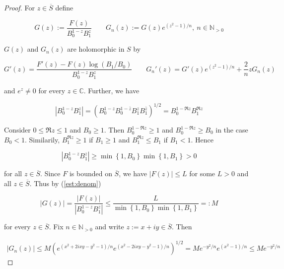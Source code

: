 \begin{proof}
For $z \in \overline{S}$ define 

\begin{equation*}
	G(z) := \frac{F(z)}{B_0^{1 - z}B_1^z} \qquad G_n(z) := G(z) e^{\left(z^2 - 1\right)/n},~n \in\mathbb{N}_{>0}
\end{equation*}

$G(z)$ and $G_n(z)$ are holomorphic in $S$ by
	
\begin{equation*}
	G'(z) = \frac{F'(z) - F(z)\log\left( B_1/B_0 \right)}{B_0^{1 - z}B_1^z} \qquad G_n'(z) = G'(z)e^{\left( z^2 - 1 \right)/n} + \frac{2}{n}zG_n(z)	
\end{equation*}

and $e^z \neq 0$ for every $z \in \mathbb{C}$. Further, we have

\begin{equation*}
		\left| B_0^{1 - z}B_1^z \right| = \left(B_0^{1 - z}B_0^{1 - \overline{z}} B_1^z B_1^{\overline{z}}\right)^{1/2} =  B_0^{1 -\Re z}B_1^{\Re z}
\end{equation*}

Consider $0 \leqslant \Re z \leqslant 1$ and $B_0 \geqslant 1$. Then $B_0^{1 - \Re z} \geqslant 1$ and $B_0^{1 - \Re z } \geqslant B_0$ in the case $B_0 < 1$. Similarily, $B_1^{\Re z} \geqslant 1$ if $B_1 \geqslant 1$ and $B_1^{\Re z} \leqslant B_1$ if $B_1 < 1$. Hence 

\begin{equation}
	\left| B_0^{1 - z}B_1^z \right| \geqslant \min\left\{1,B_0\right\}\min\left\{1,B_1\right\} > 0
	\label{est:denom}
\end{equation}

for all $z \in \overline{S}$. Since $F$ is bounded on $\overline{S}$, we have $\left| F(z) \right| \leqslant L$ for some $L > 0$ and all $z \in \overline{S}$. Thus by (\ref{est:denom})

\begin{equation*}
	\left| G(z)\right| = \frac{\left| F(z)\right|}{\left| B_0^{1 - z}B_1^z \right|} \leqslant \frac{L}{\min\left\{1,B_0\right\}\min\left\{1,B_1\right\}} =: M
\end{equation*}

for every $z \in \overline{S}$. Fix $n \in \mathbb{N}_{>0}$ and write $z := x + iy \in \overline{S}$. Then

\begin{gather*}
	\left| G_n(z)\right| \leqslant M \left(e^{\left(x^2 + 2ixy -y^2 - 1\right)/n} e^{\left(x^2 - 2ixy -y^2 - 1\right)/n}\right)^{1/2}= M e^{-y^2/n}e^{\left(x^2 - 1\right)/n} \leqslant Me^{-y^2/n}
\end{gather*}


\end{proof}
